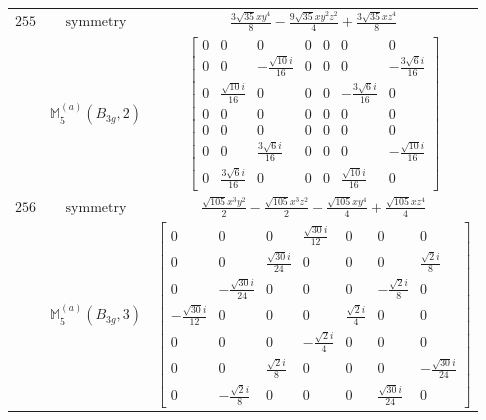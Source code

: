 \documentclass[fleqn,8pt,landscape]{jsarticle}
\begin{document}
\begin{longtable}{ccc}
$ 255 $ & $ \text{symmetry} $ & $ \frac{3 \sqrt{35} x y^{4}}{8} - \frac{9 \sqrt{35} x y^{2} z^{2}}{4} + \frac{3 \sqrt{35} x z^{4}}{8} $ \\
$  $ & $ \mathbb{M}_{5}^{(a)}(B_{3g},2) $ & $ \begin{bmatrix} 0 & 0 & 0 & 0 & 0 & 0 & 0 \\ 0 & 0 & - \frac{\sqrt{10} i}{16} & 0 & 0 & 0 & - \frac{3 \sqrt{6} i}{16} \\ 0 & \frac{\sqrt{10} i}{16} & 0 & 0 & 0 & - \frac{3 \sqrt{6} i}{16} & 0 \\ 0 & 0 & 0 & 0 & 0 & 0 & 0 \\ 0 & 0 & 0 & 0 & 0 & 0 & 0 \\ 0 & 0 & \frac{3 \sqrt{6} i}{16} & 0 & 0 & 0 & - \frac{\sqrt{10} i}{16} \\ 0 & \frac{3 \sqrt{6} i}{16} & 0 & 0 & 0 & \frac{\sqrt{10} i}{16} & 0 \end{bmatrix} $ \\ \hline
$ 256 $ & $ \text{symmetry} $ & $ \frac{\sqrt{105} x^{3} y^{2}}{2} - \frac{\sqrt{105} x^{3} z^{2}}{2} - \frac{\sqrt{105} x y^{4}}{4} + \frac{\sqrt{105} x z^{4}}{4} $ \\
$  $ & $ \mathbb{M}_{5}^{(a)}(B_{3g},3) $ & $ \begin{bmatrix} 0 & 0 & 0 & \frac{\sqrt{30} i}{12} & 0 & 0 & 0 \\ 0 & 0 & \frac{\sqrt{30} i}{24} & 0 & 0 & 0 & \frac{\sqrt{2} i}{8} \\ 0 & - \frac{\sqrt{30} i}{24} & 0 & 0 & 0 & - \frac{\sqrt{2} i}{8} & 0 \\ - \frac{\sqrt{30} i}{12} & 0 & 0 & 0 & \frac{\sqrt{2} i}{4} & 0 & 0 \\ 0 & 0 & 0 & - \frac{\sqrt{2} i}{4} & 0 & 0 & 0 \\ 0 & 0 & \frac{\sqrt{2} i}{8} & 0 & 0 & 0 & - \frac{\sqrt{30} i}{24} \\ 0 & - \frac{\sqrt{2} i}{8} & 0 & 0 & 0 & \frac{\sqrt{30} i}{24} & 0 \end{bmatrix} $ \\ \hline
\end{longtable}
\end{document}
